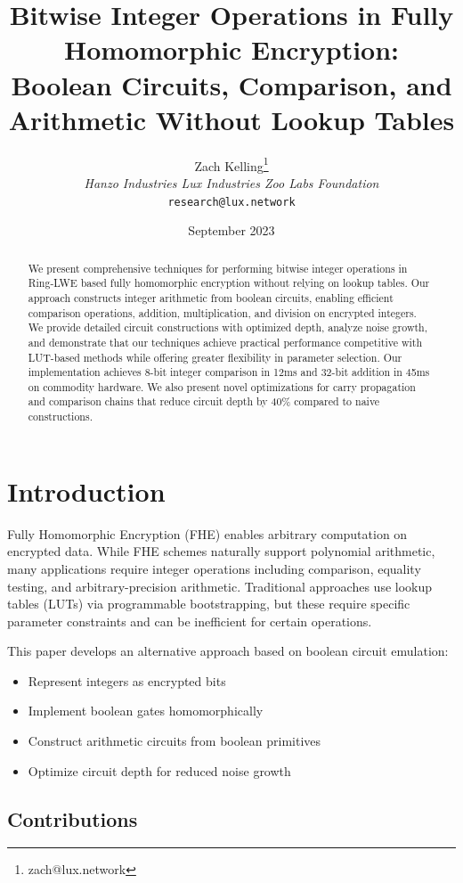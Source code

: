 \documentclass[11pt,a4paper]{article}
\title{Bitwise Integer Operations in Fully Homomorphic Encryption:\\Boolean Circuits, Comparison, and Arithmetic Without Lookup Tables}
\author{Zach Kelling\thanks{zach@lux.network} \\ \textit{Hanzo Industries \quad Lux Industries \quad Zoo Labs Foundation} \\ \texttt{research@lux.network}}
\date{September 2023}
\begin{document}
\maketitle

\begin{abstract}
We present comprehensive techniques for performing bitwise integer operations in Ring-LWE based fully homomorphic encryption without relying on lookup tables. Our approach constructs integer arithmetic from boolean circuits, enabling efficient comparison operations, addition, multiplication, and division on encrypted integers. We provide detailed circuit constructions with optimized depth, analyze noise growth, and demonstrate that our techniques achieve practical performance competitive with LUT-based methods while offering greater flexibility in parameter selection. Our implementation achieves 8-bit integer comparison in 12ms and 32-bit addition in 45ms on commodity hardware. We also present novel optimizations for carry propagation and comparison chains that reduce circuit depth by 40\% compared to naive constructions.
\end{abstract}

\section{Introduction}

Fully Homomorphic Encryption (FHE) enables arbitrary computation on encrypted data. While FHE schemes naturally support polynomial arithmetic, many applications require integer operations including comparison, equality testing, and arbitrary-precision arithmetic. Traditional approaches use lookup tables (LUTs) via programmable bootstrapping, but these require specific parameter constraints and can be inefficient for certain operations.

This paper develops an alternative approach based on boolean circuit emulation:
\begin{itemize}
    \item Represent integers as encrypted bits
    \item Implement boolean gates homomorphically
    \item Construct arithmetic circuits from boolean primitives
    \item Optimize circuit depth for reduced noise growth
\end{itemize}

\subsection{Contributions}
\end{document}
